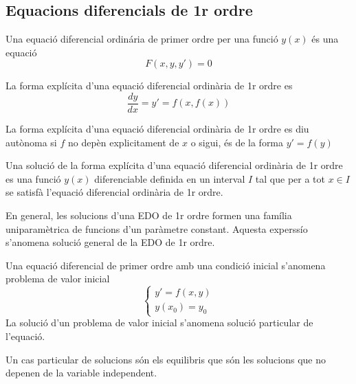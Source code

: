 \documentclass[../main.tex]{subfiles}
\begin{document}
\subsection{Equacions diferencials de 1r ordre}
\begin{definicio}
    Una equació diferencial ordinária de primer ordre per una funció $y(x)$ és una equació 
    \begin{displaymath}
        F(x,y,y') = 0
    \end{displaymath}
\end{definicio}
\begin{definicio}
    La forma explícita d'una equació diferencial ordinària de 1r ordre es
    \begin{displaymath}
        \frac{dy}{dx} = y' = f\left(x, f\left(x\right)\right)
    \end{displaymath}
\end{definicio}
\begin{definicio}
    La forma explícita d'una equació diferencial ordinària de 1r ordre es diu autònoma si $f$ no
    depèn explicitament de $x$ o sigui, és de la forma $y' = f(y)$
\end{definicio}
\begin{definicio}
    Una solució de la forma explícita d'una equació diferencial ordinària de 1r ordre es una funció
    $y(x)$ diferenciable definida en un interval $I$ tal que per a tot $x \in I$ se satisfà
    l'equació diferencial ordinària de 1r ordre.
\end{definicio}
En general, les solucions d'una EDO de 1r ordre formen una família uniparamètrica de funcions d'un
paràmetre constant. Aquesta experssío s'anomena solució general de la EDO de 1r ordre.
\begin{definicio}
    Una equació diferencial de primer ordre amb una condició inicial s'anomena problema de valor inicial
    \begin{displaymath}
        \begin{cases}
            y' = f(x, y)\\
            y(x_0) = y_0
        \end{cases}
    \end{displaymath}
    La solució d'un problema de valor inicial s'anomena solució particular de l'equació.
\end{definicio}
\begin{definicio}
    Un cas particular de solucions són els equilibris que són les solucions que no depenen de la
    variable independent.
\end{definicio}
\end{document}
